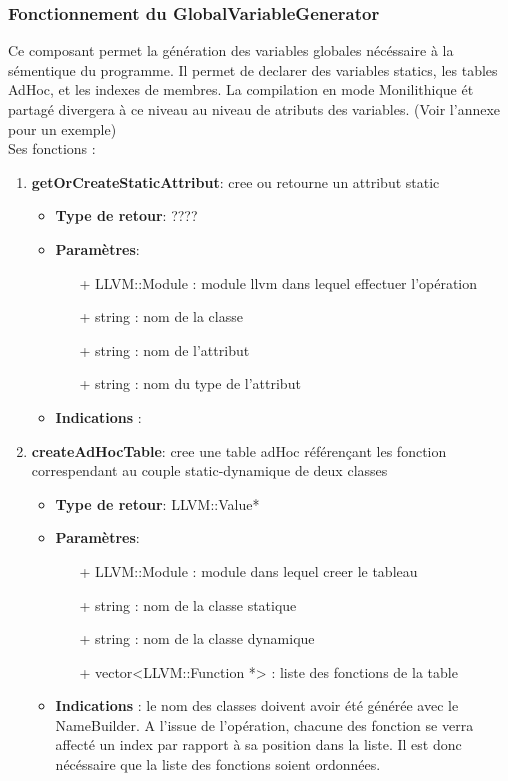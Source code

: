 \documentclass{article}
\begin{document}
   \subsubsection{Fonctionnement du GlobalVariableGenerator}
   Ce composant permet la génération des variables globales nécéssaire à la sémentique du programme.
   Il permet de declarer des variables statics, les tables AdHoc, et les indexes de membres. La compilation en mode Monilithique ét partagé divergera à ce niveau au niveau de atributs des variables.
   \small{(Voir l'annexe pour un exemple)}\\Ses fonctions :\

  \begin{enumerate}
  \item \textbf{getOrCreateStaticAttribut}: cree ou retourne un attribut static
  \begin{itemize}
    \item \textbf{Type de retour}: ????
    \item \textbf{Paramètres}:
    \begin{enumerate}
      \item[+] LLVM::Module : module llvm dans lequel effectuer l'opération
      \item[+] string : nom de la classe
      \item[+] string : nom de l'attribut
      \item[+] string : nom du type de l'attribut
    \end{enumerate}
    \item \textbf{Indications} : 
  \end{itemize} 

  \item \textbf{createAdHocTable}: cree une table adHoc référençant les fonction correspendant au couple static-dynamique de deux classes
  \begin{itemize}
    \item \textbf{Type de retour}: LLVM::Value*
    \item \textbf{Paramètres}:
    \begin{enumerate}
      \item[+] LLVM::Module : module dans lequel creer le tableau
      \item[+] string : nom de la classe statique
      \item[+] string : nom de la classe dynamique
      \item[+] vector<LLVM::Function *> : liste des fonctions de la table
    \end{enumerate}
    \item \textbf{Indications} : le nom des classes doivent avoir été générée avec le NameBuilder. A l'issue de l'opération, chacune des fonction se verra affecté un index par rapport à sa position dans la liste. Il est donc nécéssaire que la liste des fonctions soient ordonnées.
  \end{itemize}


\end{enumerate}
\end{document}
